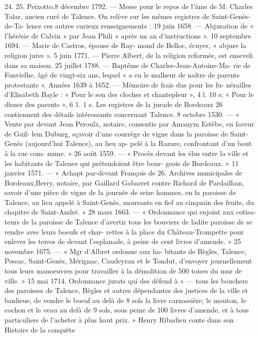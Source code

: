 \documentclass[a4paper,11pt]{book}
\begin{document}
24. 
25. Peixotto,8 décembre 1792. —
Messe pour le repos de l'âme de
M. Charles Tolar, ancien curé de Talence.
On relève sur les mêmes registres de Saint-Genès-de-Ta-
lence ces autres curieux renseignements :
19 juin 1658. — Abjuration de « l'hérésie de Calvin » par
Jean Phili « après un an d'instructions ».
10 septembre 1694. — Marie de Castros, épouse de Ray-
mond de Belloc, écuyer, « abjure la religion juive ».
5 juin 1771. — Pierre Albert, de la religion reformée, est
enseveli dans sa maison.
25 juillet 1788. — Baptême de Charles-Jean-Antoine-Ma-
rie de Fonvielhe, âgé de vingt-six ans, lequel « a eu le
malheur de naître de parents protestants ».
Années 1639 à 1652. — Mémoire de frais dus pour les fu-
nérailles d'Elisabeth Bayle :
« Pour le son des cloches et chantepleur », 4 l. 10 s;
« Pour le dîsner des parents », 6 1. 1 s.
Les registres de la jurade de Bordeaux 26 contiennent
des détails intéressants concernant Talence.
8 octobre 1530. — « Vente par devant Jean Peroulx,
notaire, consentie par Amanym Estèbe, en faveur de Guil-
lem Duburg, sçavoir d'une courrège de vigne dans la
paroisse de Saint-Genès (aujourd'hui Talence), au lieu ap-
pelé à la Razure, confrontant d'un bout à la rue com-
mune. »
26 août 1559. — « Procès devant les élus entre la ville
et les habitants de Talence qui prétendoient être bour-
geois de Bordeaux. »
11 janvier 1571. — « Achapt par-devant François de
26. Archives municipales de Bordeaux,Berry, notaire, par Gaillard Gabarret contre Richard de
Pardailhan, savoir d'une pièce de vigne de la journée de
seize hommes, en la paroisse de Talence, au lieu appelé
à Saint-Genès, mouvante en fief au cinquain des fruits, du
chapitre de Saint-André. »
28 mars 1663. — « Ordonnance qui enjoint aux cotisa-
teurs de la paroisse de Talence d'avertir tous les bouviers
de ladite paroisse de se rendre avec leurs boeufs et char-
rettes à la place du Château-Trompette pour enlever les
terres de devant l'esplanade, à peine de cent livres
d'amende. »
25 novembre 1675. — « Mgr d'Albret ordonne aux ha-
bitants de Bègles, Talence, Pessac, Saint-Genès, Mérignac,
Caudeyran et le Tondut, d'envoyer journellement tous
leurs manoeuvres pour travailler à la démolition de 500
toises du mur de ville. »
15 mai 1714.
Ordonnance
jurats
qui
des
défend
à
«
—
tous les bouchers des paroisses de Talence, Bègles et autres
dépendantes des justices de la ville et banlieue, de vendre
le boeuf au delà de 8 sols la livre carnassière; le mouton,
le cochon et le veau au delà de 9 sols,
sous peine de 100
livres d'amende, et à tous particuliers de l'acheter à plus
haut prix. »
Henry Ribadieu conte dans son Histoire de la conquête
\end{document}
